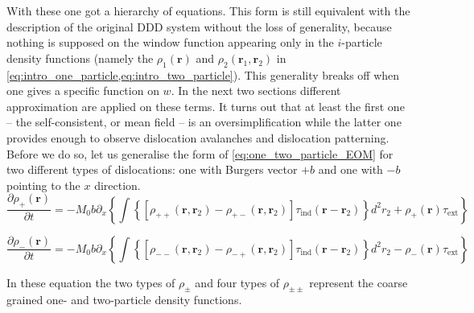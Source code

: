With these one got a hierarchy of equations. This form is still equivalent with the description of the original DDD system without the loss of generality, because nothing is supposed on the window function appearing only in the $i$-particle density functions (namely the ${\rho _1}\left( {\mathbf{r}} \right)$ and ${\rho _2}\left( {{{\mathbf{r}}_1},{{\mathbf{r}}_2}} \right)$ in \cref{eq:intro_one_particle,eq:intro_two_particle}). This generality breaks off when one gives a specific function on $w$. In the next two sections different approximation are applied on these terms. It turns out that at least the first  one -- the self-consistent, or mean field -- is an oversimplification while the latter one provides enough to observe dislocation avalanches and dislocation patterning. Before we do so, let us generalise the form of \cref{eq:one_two_particle_EOM} for two different types of dislocations: one with Burgers vector $+b$ and one with $-b$ pointing to the $x$ direction.
\begin{equation} \label{eq:intro_pos_EOM}
\frac{{\partial {\rho _ + }\left( {\mathbf{r}} \right)}}{{\partial t}} =  - {M_0}b{\partial _x}\left\{ {\int {\left\{ {\left[ {{\rho _{ +  + }}\left( {{\mathbf{r}},{{\mathbf{r}}_2}} \right) - {\rho _{ +  - }}\left( {{\mathbf{r}},{{\mathbf{r}}_2}} \right)} \right]{\tau _{{\text{ind}}}}\left( {{\mathbf{r}} - {{\mathbf{r}}_2}} \right)} \right\}{d^2}{r_2}}  + {\rho _ + }\left( {\mathbf{r}} \right){\tau _{{\text{ext}}}}} \right\}
\end{equation}

\begin{equation} \label{eq:intro_neg_EOM}
\frac{{\partial {\rho _ - }\left( {\mathbf{r}} \right)}}{{\partial t}} =  - {M_0}b{\partial _x}\left\{ {\int {\left\{ {\left[ {{\rho _{ -  - }}\left( {{\mathbf{r}},{{\mathbf{r}}_2}} \right) - {\rho _{ -  + }}\left( {{\mathbf{r}},{{\mathbf{r}}_2}} \right)} \right]{\tau _{{\text{ind}}}}\left( {{\mathbf{r}} - {{\mathbf{r}}_2}} \right)} \right\}{d^2}{r_2}}  - {\rho _ - }\left( {\mathbf{r}} \right){\tau _{{\text{ext}}}}} \right\}
\end{equation}

In these equation the two types of ${{\rho _ \pm }}$ and four types of ${{\rho _ {\pm \pm} }}$ represent the coarse grained one- and two-particle density functions.

